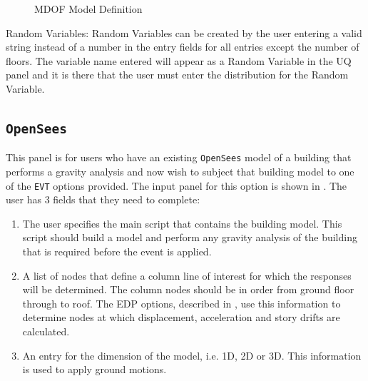 \begin{figure}[!htbp]
  \caption{MDOF Model Definition}
  \label{fig:mdof}
\end{figure}

Random Variables: Random Variables can be created by the user entering
a valid string instead of a number in the entry fields for all entries
except the number of floors. The variable name entered will appear as
a Random Variable in the UQ panel and it is there that the user must
enter the distribution for the Random Variable.

\subsection{\texttt{OpenSees}}\label{sec:OpenSeesSIM}
This panel is for users who have an existing \texttt{OpenSees} model of a
building that performs a gravity analysis and now wish to subject that
building model to one of the \texttt{EVT} options provided. The input panel
for this option is shown in . The user has 3 fields
that they need to complete:
\begin{enumerate} 
\item The user specifies the main script that contains the building
  model. This script should build a model and perform any gravity
  analysis of the building that is required before the event is
  applied.
\item A list of nodes that define a column line of interest for which
  the responses will be determined. The column nodes should be in
  order from ground floor through to roof. The EDP options, described
  in , use this information to determine nodes at which
  displacement, acceleration and story drifts are calculated.
\item An entry for the dimension of the model, i.e. 1D, 2D or 3D. This
  information is used to apply ground motions.
\end{enumerate}

